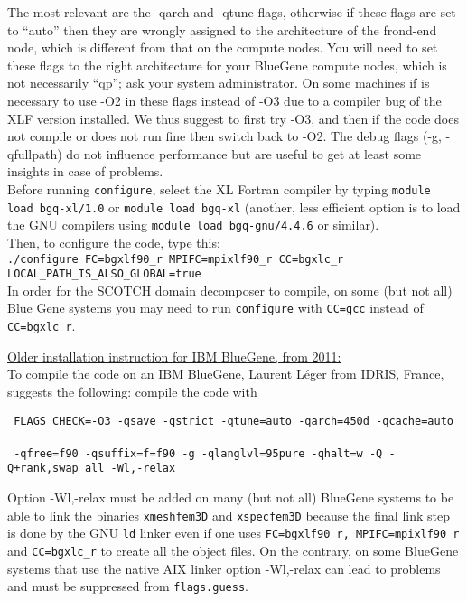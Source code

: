\noindent The most relevant are the -qarch and -qtune flags, otherwise
if these flags are set to ``auto'' then they are wrongly assigned
to the architecture of the frond-end node, which is different from
that on the compute nodes. You will need to set these flags to the
right architecture for your BlueGene compute nodes, which is not necessarily
``qp''; ask your system administrator. On some machines if is necessary
to use -O2 in these flags instead of -O3 due to a compiler bug of
the XLF version installed. We thus suggest to first try -O3, and then
if the code does not compile or does not run fine then switch back
to -O2. The debug flags (-g, -qfullpath) do not influence performance
but are useful to get at least some insights in case of problems.\\


\noindent Before running \texttt{configure}, select the XL Fortran
compiler by typing \texttt{module load bgq-xl/1.0} or \texttt{module
load bgq-xl} (another, less efficient option is to load the GNU compilers
using \texttt{module load bgq-gnu/4.4.6} or similar).\\


\noindent Then, to configure the code, type this:\\


\noindent \texttt{./configure FC=bgxlf90\_r MPIFC=mpixlf90\_r CC=bgxlc\_r
LOCAL\_PATH\_IS\_ALSO\_GLOBAL=true}\\


In order for the SCOTCH domain decomposer to compile, on some (but
not all) Blue Gene systems you may need to run \texttt{configure}
with \texttt{CC=gcc} instead of \texttt{CC=bgxlc\_r}.

\noindent \underline{Older installation instruction for IBM BlueGene, from 2011:}\\


\noindent To compile the code on an IBM BlueGene, Laurent L\'eger from
IDRIS, France, suggests the following: compile the code with

\noindent \texttt{ FLAGS\_CHECK=\textquotedbl{}-O3 -qsave -qstrict
-qtune=auto -qarch=450d -qcache=auto }~\\
 \texttt{ -qfree=f90 -qsuffix=f=f90 -g -qlanglvl=95pure -qhalt=w -Q
-Q+rank,swap\_all -Wl,-relax\textquotedbl{}}

\noindent Option \textquotedbl{}-Wl,-relax\textquotedbl{} must be
added on many (but not all) BlueGene systems to be able to link the
binaries \texttt{xmeshfem3D} and \texttt{xspecfem3D} because the final
link step is done by the GNU \texttt{ld} linker even if one uses \texttt{FC=bgxlf90\_r,
MPIFC=mpixlf90\_r} and \texttt{CC=bgxlc\_r} to create all the object
files. On the contrary, on some BlueGene systems that use the native
AIX linker option \textquotedbl{}-Wl,-relax\textquotedbl{} can lead
to problems and must be suppressed from \texttt{flags.guess}.

